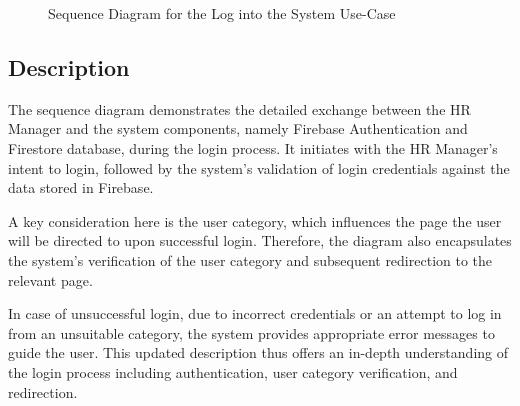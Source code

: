 \begin{figure}[H]
    \centering
    \caption{ Sequence Diagram for the Log into the System Use-Case }
    \label{fig:UseCase2_Sequence_Diagram}
\end{figure}

\subsection*{Description}
The sequence diagram demonstrates the detailed exchange between the HR Manager and the system components, namely Firebase Authentication and Firestore database, during the login process. It initiates with the HR Manager's intent to login, followed by the system's validation of login credentials against the data stored in Firebase.

A key consideration here is the user category, which influences the page the user will be directed to upon successful login. Therefore, the diagram also encapsulates the system's verification of the user category and subsequent redirection to the relevant page.

In case of unsuccessful login, due to incorrect credentials or an attempt to log in from an unsuitable category, the system provides appropriate error messages to guide the user. This updated description thus offers an in-depth understanding of the login process including authentication, user category verification, and redirection.

